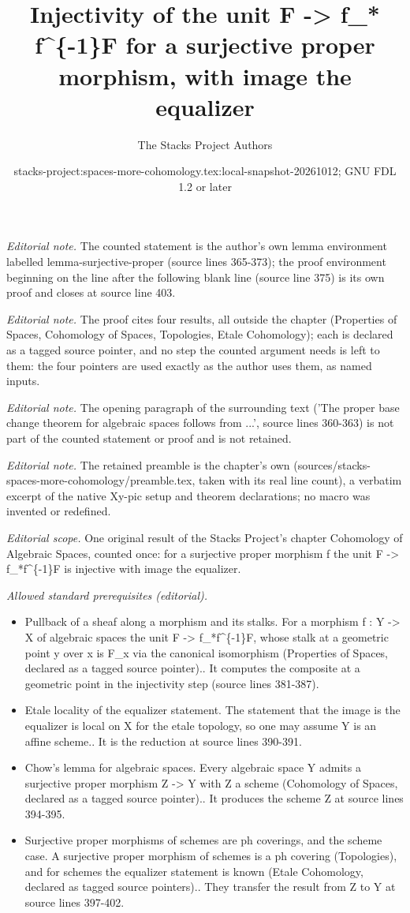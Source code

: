 \documentclass{stacks-project}
\title{Injectivity of the unit F -> f\_* f\textasciicircum{}\{-1\}F for a surjective proper morphism, with image the equalizer}
\author{The Stacks Project Authors}
\date{stacks-project:spaces-more-cohomology.tex:local-snapshot-20261012; GNU FDL 1.2 or later}
\theoremstyle{plain}
\theoremstyle{definition}
\theoremstyle{remark}
\numberwithin{equation}{subsection}
\begin{document}
\maketitle
\noindent\textit{Editorial note.} The counted statement is the author's own lemma environment labelled lemma-surjective-proper (source lines 365-373); the proof environment beginning on the line after the following blank line (source line 375) is its own proof and closes at source line 403.\par\medskip
\noindent\textit{Editorial note.} The proof cites four results, all outside the chapter (Properties of Spaces, Cohomology of Spaces, Topologies, Etale Cohomology); each is declared as a tagged source pointer, and no step the counted argument needs is left to them: the four pointers are used exactly as the author uses them, as named inputs.\par\medskip
\noindent\textit{Editorial note.} The opening paragraph of the surrounding text ('The proper base change theorem for algebraic spaces follows from ...', source lines 360-363) is not part of the counted statement or proof and is not retained.\par\medskip
\noindent\textit{Editorial note.} The retained preamble is the chapter's own (sources/stacks-spaces-more-cohomology/preamble.tex, taken with its real line count), a verbatim excerpt of the native Xy-pic setup and theorem declarations; no macro was invented or redefined.\par\medskip
\noindent\textit{Editorial scope.} One original result of the Stacks Project's chapter Cohomology of Algebraic Spaces, counted once: for a surjective proper morphism f the unit F -> f\_*f\textasciicircum{}\{-1\}F is injective with image the equalizer.\par\medskip
\noindent\textit{Allowed standard prerequisites (editorial).}\begin{itemize}
\item Pullback of a sheaf along a morphism and its stalks. For a morphism f : Y -> X of algebraic spaces the unit F -> f\_*f\textasciicircum{}\{-1\}F, whose stalk at a geometric point y over x is F\_x via the canonical isomorphism (Properties of Spaces, declared as a tagged source pointer).. It computes the composite at a geometric point in the injectivity step (source lines 381-387).
\item Etale locality of the equalizer statement. The statement that the image is the equalizer is local on X for the etale topology, so one may assume Y is an affine scheme.. It is the reduction at source lines 390-391.
\item Chow's lemma for algebraic spaces. Every algebraic space Y admits a surjective proper morphism Z -> Y with Z a scheme (Cohomology of Spaces, declared as a tagged source pointer).. It produces the scheme Z at source lines 394-395.
\item Surjective proper morphisms of schemes are ph coverings, and the scheme case. A surjective proper morphism of schemes is a ph covering (Topologies), and for schemes the equalizer statement is known (Etale Cohomology, declared as tagged source pointers).. They transfer the result from Z to Y at source lines 397-402.
\end{itemize}\medskip
\end{document}
